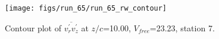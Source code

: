 \begin{figure}[H]
\centering
\texttt{[image: figs/run\_65/run\_65\_rw\_contour]}
\caption{Contour plot of $\overline{v_{r}^{\prime} v_{z}^{\prime}}$ at $z/c$=10.00, $V_{free}$=23.23, station 7.}
\label{fig:run_65_rw_contour}
\end{figure}


